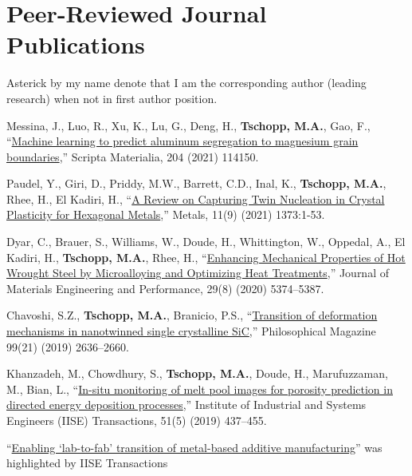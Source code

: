 
\section{\sc Peer-Reviewed Journal Publications}

Asterick by my name denote that I am the corresponding author (leading research) when not in first author position.

\begin{cvlist}
\setlength{\itemsep}{0in}
\setlength{\parsep}{0in} 
\setlength{\parskip}{0in}
\setlength{\topsep}{0in} 
\setlength{\partopsep}{0in} 
\setlength{\leftmargin}{0.2in}

\item
Messina, J., Luo, R., Xu, K., Lu, G., Deng, H., \textbf{Tschopp, M.A.}, Gao, F., ``\href{https://doi.org/10.1016/j.scriptamat.2021.114150}{Machine learning to predict aluminum segregation to magnesium grain boundaries},'' Scripta Materialia, 204 (2021) 114150.

\item
Paudel, Y., Giri, D., Priddy, M.W., Barrett, C.D., Inal, K.,  \textbf{Tschopp, M.A.}, Rhee, H., El Kadiri, H., ``\href{https://doi.org/10.3390/met11091373}{A Review on Capturing Twin Nucleation in Crystal Plasticity for Hexagonal Metals},'' Metals, 11(9) (2021) 1373:1-53.

\item
Dyar, C., Brauer, S., Williams, W., Doude, H., Whittington, W., Oppedal, A., El Kadiri, H., \textbf{Tschopp, M.A.}, Rhee, H., ``\href{https://doi.org/10.1007/s11665-020-05005-3}{Enhancing Mechanical Properties of Hot Wrought Steel by Microalloying and Optimizing Heat Treatments},'' Journal of Materials Engineering and Performance, 29(8) (2020) 5374--5387.

\item
Chavoshi, S.Z., \textbf{Tschopp, M.A.}, Branicio, P.S., ``\href{https://doi.org/10.1080/14786435.2019.1637033}{Transition of deformation mechanisms in nanotwinned single crystalline SiC},'' Philosophical Magazine 99(21) (2019) 2636--2660.

\item
{Khanzadeh, M.}, {Chowdhury, S.}, \textbf{Tschopp, M.A.}, Doude, H., Marufuzzaman, M., Bian, L., ``\href{https://doi.org/10.1080/24725854.2017.1417656}{In-situ monitoring of melt pool images for porosity prediction in directed energy deposition processes},'' Institute of Industrial and Systems Engineers (IISE) Transactions, 51(5) (2019) 437--455.
\begin{list2}
\item[$\star$] ``\href{https://www.iise.org/iemagazine/2019-04/html/research/research.html}{Enabling `lab-to-fab' transition of metal-based additive manufacturing}'' was highlighted by IISE Transactions
\end{list2}


\end{cvlist}
